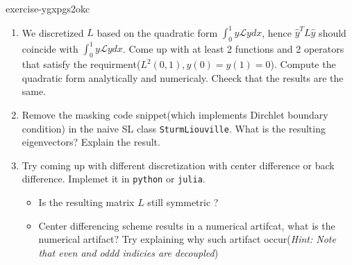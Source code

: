 \begin{mystexercise}{}{exercise-ygxpgs2okc}\label{exercise-yGXPGs2okc}\label{exercise-ygxpgs2okc}\begin{enumerate}
\item We discretized $L$ based on the quadratic form $\int_0^1 y\mathcal L y dx$, hence $\hat y^T L\hat y$ should coincide with $\int_0^1 y\mathcal L y dx$. Come up with at least 2 functions and 2 operators that satisfy the requirment($L^2(0,1),y(0)=y(1)=0$). Compute the quadratic form analytically and numericaly. Cheeck that the results are the same.
\item Remove the masking code snippet(which implements Dirchlet boundary condition) in the naive SL class \texttt{SturmLiouville}. What is the resulting eigenvectors? Explain the result.
\item Try coming up with different discretization with center difference or back difference. Implemet it in \texttt{python}
or \texttt{julia}.

\begin{itemize}
\item Is the resulting matrix $L$ still symmetric ?
\item Center differencing scheme results in a numerical artifcat, what is the numerical artifact? Try explaining why such artifact occur(\textit{Hint: Note that even and oddd indicies are decoupled})
\end{itemize}
\end{enumerate}

\end{mystexercise}
%  
% 
%